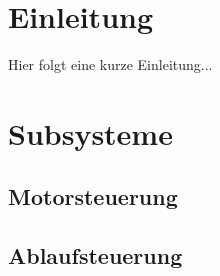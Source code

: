 \hypertarget{index_sec1}{}\section{\-Einleitung}\label{index_sec1}
\-Hier folgt eine kurze \-Einleitung...\hypertarget{index_sec2}{}\section{\-Subsysteme}\label{index_sec2}
\hypertarget{index_sec2_1}{}\subsection{\-Motorsteuerung}\label{index_sec2_1}
\hypertarget{index_sec2_2}{}\subsection{\-Ablaufsteuerung}\label{index_sec2_2}
